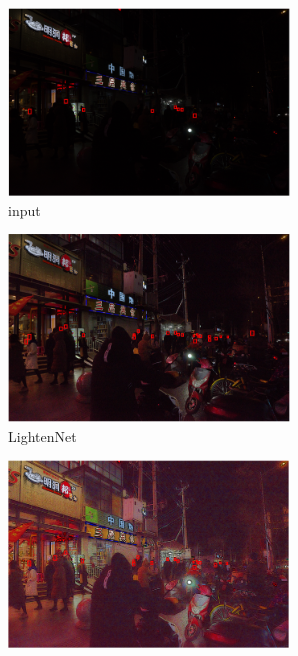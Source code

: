 \documentclass[letterpaper,12pt]{article}
\begin{document}
		\begin{figure}[htbp] 
		\centering 
		\begin{subfigure}{0.22\textwidth}
			\includegraphics[width=\linewidth]{DARK_FACE/input}
			\captionsetup{font=scriptsize}
			\caption{input}
			\label{fig: DARK_FACE_a}
		\end{subfigure}
		\begin{subfigure}{0.22\textwidth}
			\includegraphics[width=\linewidth]{DARK_FACE/LightenNet}
			\captionsetup{font=scriptsize}
			\caption{LightenNet}
			\label{fig: DARK_FACE_b}
		\end{subfigure}
		\begin{subfigure}{0.22\textwidth}
			\includegraphics[width=\linewidth]{DARK_FACE/Retinex-Net}

\end{subfigure}
\end{figure}
\end{document}
